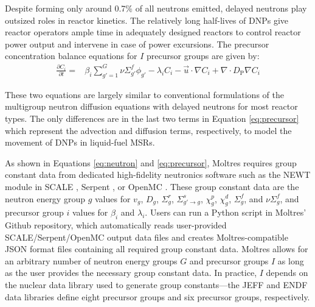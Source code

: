 Despite forming only around 0.7\% of all neutrons emitted, delayed neutrons
play outsized roles in reactor kinetics. The relatively long half-lives of
\glspl{DNP} give reactor operators ample time in adequately designed reactors
to control reactor power output and intervene in case of power excursions.
The precursor concentration balance equations for $I$ precursor
groups are given by:
%
\begin{align}
    \frac{\partial C_i}{\partial t} =& \beta_i \sum^G_{g'=1} \nu \Sigma^f_{g'}
    \phi_{g'} - \lambda_i C_i - \vec{u} \cdot \nabla C_i + \nabla \cdot
    D_{\text{P}} \nabla C_i \label{eq:precursor} %
\end{align}

These two equations are largely similar to conventional formulations of the
multigroup neutron diffusion equations with delayed neutrons for most reactor
types. The only differences are in the last two terms in Equation
\ref{eq:precursor}
which represent the advection and diffusion terms, respectively, to model the
movement of \glspl{DNP} in liquid-fuel \glspl{MSR}.

As shown in Equations \ref{eq:neutron} and \ref{eq:precursor}, Moltres requires
group constant data from dedicated high-fidelity neutronics software such as
the NEWT module in SCALE \cite{dehart_reactor_2011}, Serpent
\cite{leppanen_serpent_2014}, or OpenMC \cite{romano_openmc:_2015}. These group
constant data are the neutron energy group $g$ values for $v_g$, $D_g$,
$\Sigma^r_g$, $\Sigma^s_{g' \rightarrow g}$, $\chi^p_g$, $\chi^d_g$,
$\Sigma^f_{g}$, and $\nu\Sigma^f_{g}$, and precursor group $i$ values for
$\beta_i$ and $\lambda_i$. Users
can run a Python script in Moltres' Github repository, which automatically reads
user-provided SCALE/Serpent/OpenMC output data files and creates
Moltres-compatible JSON format files containing all required group constant
data. Moltres allows for an arbitrary number of neutron energy groups $G$ and
precursor groups $I$ as long as the user provides the necessary group constant
data. In practice, $I$ depends on the nuclear data library used to generate
group constants---the JEFF \cite{plompen_joint_2020} and ENDF
\cite{brown_endfb-viii0_2018} data libraries define eight precursor groups
and six precursor groups, respectively.


